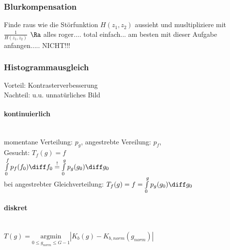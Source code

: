 \documentclass[6pt,a4paper]{scrartcl}
\begin{document}
\begin{multicols}{4}
{		
	\subsubsection{Blurkompensation}
		Finde raus wie die Störfunktion $H(z_1,z_2)$  aussieht und musltipliziere mit $\frac{1}{H(z_1,z_2)}$  $\Ra$ alles roger.... total einfach... am besten mit dieser Aufgabe anfangen..... NICHT!!!
	\subsubsection{Histogrammausgleich}
		Vorteil: Kontrasterverbesserung \\
		Nachteil: u.u. unnatürliches Bild
	\paragraph{kontinuierlich} $\;$\\
		momentane Verteilung: $p_g$, angestrebte Vereilung: $p_ f$,\\
		 Gesucht: $T_f(g) = f$\\
		$\int \limits_0^f p_f(f_0)\diff f_0 \overset{!}{=} \int \limits_0^g p_g(g_0)\diff g_0$ \\
		bei angestrebter Gleichverteilung: $T_f(g) = f = \int \limits_0^g p_g(g_0)\diff g_0$
	\paragraph{diskret}$\;$\\
	$T(g) = \underset{0\le g_{norm} \le G-1}{\text{argmin}} |K_b(g)-K_{b,norm}(g_{norm})|$

}

\end{multicols}
\end{document}
